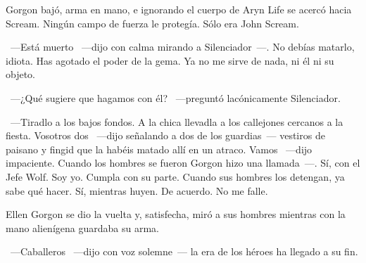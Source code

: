 Gorgon bajó, arma en mano, e ignorando el cuerpo de Aryn Life se acercó hacia Scream. Ningún campo de fuerza le protegía. Sólo era John Scream.

~---Está muerto ~---dijo con calma mirando a Silenciador~---. No debías matarlo, idiota. Has agotado el poder de la gema. Ya no me sirve de nada, ni él ni su objeto.

~---¿Qué sugiere que hagamos con él? ~---preguntó lacónicamente Silenciador.

~---Tiradlo a los bajos fondos. A la chica llevadla a los callejones cercanos a la fiesta. Vosotros dos ~---dijo señalando a dos de los guardias~--- vestiros de paisano y fingid que la habéis matado allí en un atraco. Vamos ~---dijo impaciente. Cuando los hombres se fueron Gorgon hizo una llamada~---. Sí, con el Jefe Wolf. Soy yo. Cumpla con su parte. Cuando sus hombres los detengan, ya sabe qué hacer. Sí, mientras huyen. De acuerdo. No me falle.

Ellen Gorgon se dio la vuelta y, satisfecha, miró a sus hombres mientras con la mano alienígena guardaba su arma.

~---Caballeros ~---dijo con voz solemne~--- la era de los héroes ha llegado a su fin.

\endinput
